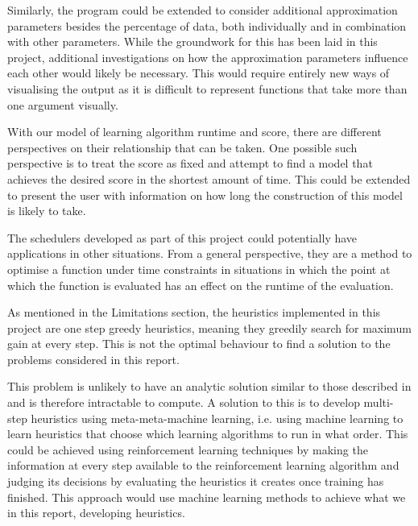 \documentclass[a4paper,12pt,twoside,openright]{report}
\begin{document}
Similarly, the program could be extended to consider additional approximation parameters besides the percentage of data, both individually and in combination with other parameters. While the groundwork for this has been laid in this project, additional investigations on how the approximation parameters influence each other would likely be necessary. This would require entirely new ways of visualising the output as it is difficult to represent functions that take more than one argument visually.

With our model of learning algorithm runtime and score, there are different perspectives on their relationship that can be taken. One possible such perspective is to treat the score as fixed and attempt to find a model that achieves the desired score in the shortest amount of time. This could be extended to present the user with information on how long the construction of this model is likely to take.

The schedulers developed as part of this project could potentially have applications in other situations. From a general perspective, they are a method to optimise a function under time constraints in situations in which the point at which the function is evaluated has an effect on the runtime of the evaluation. 

As mentioned in the Limitations section, the heuristics implemented in this project are one step greedy heuristics, meaning they greedily search for maximum gain at every step. This is not the optimal behaviour to find a solution to the problems considered in this report.

This problem is unlikely to have an analytic solution similar to those described in \cite{Gittins79banditprocesses} and is therefore intractable to compute. A solution to this is to develop multi-step heuristics using meta-meta-machine learning, i.e. using machine learning to learn heuristics that choose which learning algorithms to run in what order. This could be achieved using reinforcement learning techniques by making the information at every step available to the reinforcement learning algorithm and judging its decisions by evaluating the heuristics it creates once training has finished. This approach would use machine learning methods to achieve what we in this report, developing heuristics.


\appendix
\singlespacing



 

\end{document}
